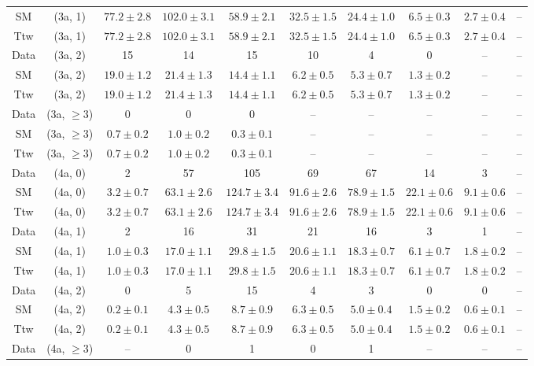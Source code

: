 \begin{table}[h!]
{\begin{tabular}{cccccccccc}
	SM & (3a, 1) & $77.2\pm 2.8$ & $102.0\pm 3.1$ & $58.9\pm 2.1$ & $32.5\pm 1.5$ & $24.4\pm 1.0$ & $6.5\pm 0.3$ & $2.7\pm 0.4$ & -- \\[0.5ex] 
	Ttw & (3a, 1) & $77.2\pm 2.8$ & $102.0\pm 3.1$ & $58.9\pm 2.1$ & $32.5\pm 1.5$ & $24.4\pm 1.0$ & $6.5\pm 0.3$ & $2.7\pm 0.4$ & -- \\[0.5ex] 
	Data & (3a, 2) & 15 & 14 & 15 & 10 & 4 & 0 & -- & -- \\[0.5ex] 
	SM & (3a, 2) & $19.0\pm 1.2$ & $21.4\pm 1.3$ & $14.4\pm 1.1$ & $6.2\pm 0.5$ & $5.3\pm 0.7$ & $1.3\pm 0.2$ & -- & -- \\[0.5ex] 
	Ttw & (3a, 2) & $19.0\pm 1.2$ & $21.4\pm 1.3$ & $14.4\pm 1.1$ & $6.2\pm 0.5$ & $5.3\pm 0.7$ & $1.3\pm 0.2$ & -- & -- \\[0.5ex] 
	Data & (3a, $\ge3$) & 0 & 0 & 0 & -- & -- & -- & -- & -- \\[0.5ex] 
	SM & (3a, $\ge3$) & $0.7\pm 0.2$ & $1.0\pm 0.2$ & $0.3\pm 0.1$ & -- & -- & -- & -- & -- \\[0.5ex] 
	Ttw & (3a, $\ge3$) & $0.7\pm 0.2$ & $1.0\pm 0.2$ & $0.3\pm 0.1$ & -- & -- & -- & -- & -- \\[0.5ex] 
	Data & (4a, 0) & 2 & 57 & 105 & 69 & 67 & 14 & 3 & -- \\[0.5ex] 
	SM & (4a, 0) & $3.2\pm 0.7$ & $63.1\pm 2.6$ & $124.7\pm 3.4$ & $91.6\pm 2.6$ & $78.9\pm 1.5$ & $22.1\pm 0.6$ & $9.1\pm 0.6$ & -- \\[0.5ex] 
	Ttw & (4a, 0) & $3.2\pm 0.7$ & $63.1\pm 2.6$ & $124.7\pm 3.4$ & $91.6\pm 2.6$ & $78.9\pm 1.5$ & $22.1\pm 0.6$ & $9.1\pm 0.6$ & -- \\[0.5ex] 
	Data & (4a, 1) & 2 & 16 & 31 & 21 & 16 & 3 & 1 & -- \\[0.5ex] 
	SM & (4a, 1) & $1.0\pm 0.3$ & $17.0\pm 1.1$ & $29.8\pm 1.5$ & $20.6\pm 1.1$ & $18.3\pm 0.7$ & $6.1\pm 0.7$ & $1.8\pm 0.2$ & -- \\[0.5ex] 
	Ttw & (4a, 1) & $1.0\pm 0.3$ & $17.0\pm 1.1$ & $29.8\pm 1.5$ & $20.6\pm 1.1$ & $18.3\pm 0.7$ & $6.1\pm 0.7$ & $1.8\pm 0.2$ & -- \\[0.5ex] 
	Data & (4a, 2) & 0 & 5 & 15 & 4 & 3 & 0 & 0 & -- \\[0.5ex] 
	SM & (4a, 2) & $0.2\pm 0.1$ & $4.3\pm 0.5$ & $8.7\pm 0.9$ & $6.3\pm 0.5$ & $5.0\pm 0.4$ & $1.5\pm 0.2$ & $0.6\pm 0.1$ & -- \\[0.5ex] 
	Ttw & (4a, 2) & $0.2\pm 0.1$ & $4.3\pm 0.5$ & $8.7\pm 0.9$ & $6.3\pm 0.5$ & $5.0\pm 0.4$ & $1.5\pm 0.2$ & $0.6\pm 0.1$ & -- \\[0.5ex] 
	Data & (4a, $\ge3$) & -- & 0 & 1 & 0 & 1 & -- & -- & -- \\[0.5ex] 

\end{tabular}}
\end{table}
